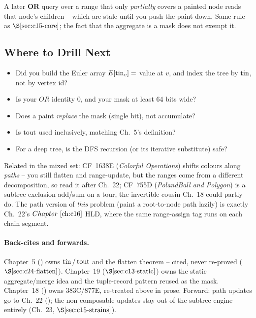 \begin{warningbox}
A later \(\mathbf{OR}\) query over a range that only \emph{partially} covers a painted node reads that node's children -- which are stale until you push the paint down.  Same rule as \(\secref{c15-core}\); the fact that the aggregate is a mask does not exempt it.
\end{warningbox}

\subsection{Where to Drill Next}

\begin{stuckbox}
\begin{itemize}[nosep,leftmargin=1.4em]
  \item Did you build the Euler array \(E[\operatorname{tin}_v]=\) value at \(v\), and index the tree by \(\operatorname{tin}\), not by vertex id?
  \item Is your \(\mathit{OR}\) identity \(0\), and your mask at least 64 bits wide?
  \item Does a paint \emph{replace} the mask (single bit), not accumulate?
  \item Is \(\operatorname{tout}\) used inclusively, matching Ch.~5's definition?
  \item For a deep tree, is the DFS recursion (or its iterative substitute) safe?
\end{itemize}
\end{stuckbox}

Related in the mixed set: CF~1638E (\emph{Colorful Operations}) shifts colours along \emph{paths} -- you still flatten and range-update, but the ranges come from a different decomposition, so read it after Ch.~22; CF~755D (\emph{PolandBall and Polygon}) is a subtree-exclusion add/sum on a tour, the invertible cousin Ch.~18 could partly do.  The path version of \emph{this} problem (paint a root-to-node path lazily) is exactly Ch.~22's \(\chref{c16}\) HLD, where the same range-assign tag runs on each chain segment.

\paragraph{Back-cites and forwards.}
Chapter~5 () owns \(\operatorname{tin}/\operatorname{tout}\) and the flatten theorem -- cited, never re-proved (\(\secref{c24-flatten}\)).  Chapter~19 (\(\secref{c13-static}\)) owns the static aggregate/merge idea and the tuple-record pattern reused as the mask.  Chapter~18 () owns 383C/877E, re-treated above in prose.  Forward: path updates go to Ch.~22 (); the non-composable updates stay out of the subtree engine entirely (Ch.~23, \(\secref{c15-strains}\)).

